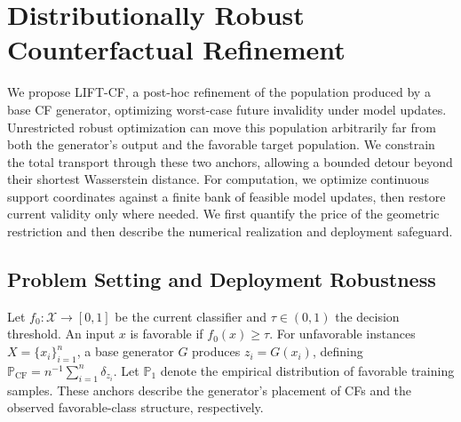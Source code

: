 
\section{Distributionally Robust Counterfactual Refinement}
\label{sec:new-method}

We propose \textsc{LIFT-CF}, a post-hoc refinement of the population produced by a base CF generator, optimizing worst-case future invalidity under model updates.
Unrestricted robust optimization can move this population arbitrarily far from both the generator's output and the favorable target population.
We constrain the total transport through these two anchors, allowing a bounded detour beyond their shortest Wasserstein distance.
For computation, we optimize continuous support coordinates against a finite bank of feasible model updates, then restore current validity only where needed.
We first quantify the price of the geometric restriction and then describe the numerical realization and deployment safeguard.

\subsection{Problem Setting and Deployment Robustness}
\label{sec:new-objective}

Let $f_0:\mathcal X\to[0,1]$ be the current classifier and $\tau\in(0,1)$ the decision threshold.
An input $x$ is favorable if $f_0(x)\ge\tau$.
For unfavorable instances $X=\{x_i\}_{i=1}^n$, a base generator $G$ produces $z_i=G(x_i)$, defining $\mathbb P_{\mathrm{CF}}=n^{-1}\sum_{i=1}^n\delta_{z_i}$.
Let $\mathbb P_1$ denote the empirical distribution of favorable training samples.
These anchors describe the generator's placement of CFs and the observed favorable-class structure, respectively.

